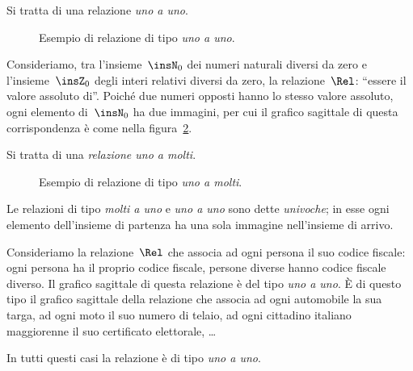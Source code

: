 \begin{exrig}
\begin{esempio}
Si tratta di una relazione \emph{uno a uno}.
\begin{figure}[bht]
 \centering
 \caption{Esempio di relazione di tipo \emph{uno a uno}.}\label{fig:7.8}
\end{figure}
\end{esempio}

\begin{esempio}
Consideriamo, tra l'insieme~$\insN_0$ dei numeri naturali diversi da zero e l'insieme~$\insZ_0$ degli interi relativi diversi da zero, la relazione~$\Rel$: ``essere il valore assoluto di''.
Poiché due numeri opposti hanno lo stesso valore assoluto,
ogni elemento di~$\insN_0$ ha due immagini, per cui il grafico sagittale di questa corrispondenza è come nella figura~\ref{fig:7.9}.

Si tratta di una \emph{relazione uno a molti}.
\end{esempio}
\begin{figure}[hbt]
 \centering
 \caption{Esempio di relazione di tipo \emph{uno a molti}.}\label{fig:7.9}
\end{figure}

\end{exrig}

\begin{definizione}
Le relazioni di tipo \emph{molti a uno} e \emph{uno a uno} sono dette \emph{univoche}; in esse ogni elemento dell'insieme di partenza ha una sola immagine nell'insieme di arrivo.
\end{definizione}
\begin{exrig}
\begin{esempio}
Consideriamo la relazione~$\Rel$ che associa ad ogni persona il suo codice fiscale: ogni persona ha il proprio codice fiscale, persone diverse hanno codice fiscale diverso.
Il grafico sagittale di questa relazione
è del tipo \emph{uno a uno}. È di questo tipo il grafico sagittale della relazione che associa ad ogni automobile la sua targa, ad ogni moto il suo numero di telaio,
ad ogni cittadino italiano maggiorenne il suo certificato elettorale, \ldots

In tutti questi casi la relazione è di tipo \emph{uno a uno}.
\end{esempio}
\end{exrig}
\ovalbox{\risolvii \ref{ese:7.47}, \ref{ese:7.48}, \ref{ese:7.49}, \ref{ese:7.50}}
\newpage

\cleardoublepage
